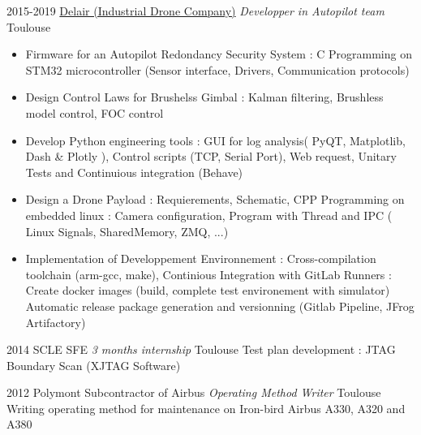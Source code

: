 \documentclass[a4paper]{friggeri-cv} %
\begin{document}
\begin{entrylist}
\entry
{2015-2019}
{\href{https://delair.aero}{Delair (Industrial Drone Company)} \textit{ Developper in Autopilot team}}
{Toulouse}
{
\begin{itemize}
\item Firmware for an Autopilot Redondancy Security System : C Programming on STM32 microcontroller (Sensor interface, Drivers, Communication protocols)
\item Design Control Laws for Brushelss Gimbal : Kalman filtering, Brushless model control, FOC control
\item Develop Python engineering tools : GUI for log analysis( PyQT, Matplotlib, Dash \& Plotly ), Control scripts (TCP, Serial Port), Web request, Unitary Tests and Continuious integration (Behave)
\item Design a Drone Payload : Requierements, Schematic, CPP Programming on embedded linux : Camera configuration, Program with Thread and IPC (  Linux Signals, SharedMemory, ZMQ, ...)
\item Implementation of Developpement Environnement : Cross-compilation toolchain (arm-gcc, make), Continious Integration with GitLab Runners : Create docker images (build, complete test environement with simulator) Automatic release package generation and versionning (Gitlab Pipeline, JFrog Artifactory)
\end{itemize}
%
}
\entry
{2014}
{SCLE SFE \textit{3 months internship}}
{Toulouse}
{Test plan development : JTAG Boundary Scan (XJTAG Software)
}

\entry
{2012}
{Polymont Subcontractor of Airbus \textit{Operating Method Writer}}
{Toulouse}
{ Writing operating method for maintenance on Iron-bird Airbus A330, A320 and A380 }


\end{entrylist}

\end{document}
